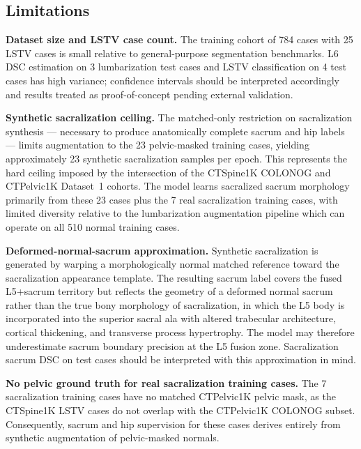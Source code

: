 \documentclass{article}
\begin{document}
\subsection{Limitations}

\textbf{Dataset size and LSTV case count.} The training cohort of 784 cases
with 25 LSTV cases is small relative to general-purpose segmentation benchmarks.
L6 DSC estimation on 3 lumbarization test cases and LSTV classification on
4 test cases has high variance; confidence intervals should be interpreted
accordingly and results treated as proof-of-concept pending external validation.

\textbf{Synthetic sacralization ceiling.} The matched-only restriction on
sacralization synthesis --- necessary to produce anatomically complete
sacrum and hip labels --- limits augmentation to the 23 pelvic-masked training
cases, yielding approximately 23 synthetic sacralization samples per epoch.
This represents the hard ceiling imposed by the intersection of the CTSpine1K
COLONOG and CTPelvic1K Dataset~1 cohorts. The model learns sacralized sacrum
morphology primarily from these 23 cases plus the 7 real sacralization training
cases, with limited diversity relative to the lumbarization augmentation
pipeline which can operate on all 510 normal training cases.

\textbf{Deformed-normal-sacrum approximation.} Synthetic sacralization is
generated by warping a morphologically normal matched reference toward the
sacralization appearance template. The resulting sacrum label covers the fused
L5+sacrum territory but reflects the geometry of a deformed normal sacrum rather
than the true bony morphology of sacralization, in which the L5 body is
incorporated into the superior sacral ala with altered trabecular architecture,
cortical thickening, and transverse process hypertrophy. The model may therefore
underestimate sacrum boundary precision at the L5 fusion zone. Sacralization
sacrum DSC on test cases should be interpreted with this approximation in mind.

\textbf{No pelvic ground truth for real sacralization training cases.} The 7
sacralization training cases have no matched CTPelvic1K pelvic mask, as the
CTSpine1K LSTV cases do not overlap with the CTPelvic1K COLONOG subset.
Consequently, sacrum and hip supervision for these cases derives entirely from
synthetic augmentation of pelvic-masked normals.
\end{document}

